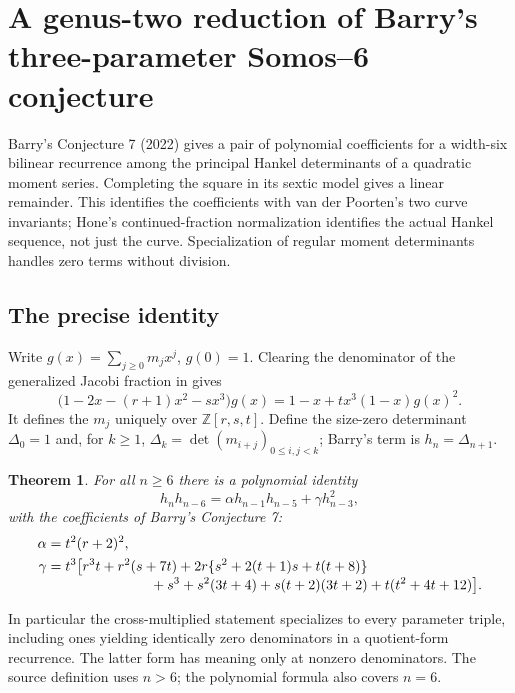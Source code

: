 \documentclass[11pt,a4paper]{article}
\numberwithin{equation}{section}
\newtheorem{theorem}{Theorem}[section]
\theoremstyle{definition}
\theoremstyle{remark}
\newenvironment{sectionabstract}{\par\smallskip\begingroup\small\noindent}{\par\endgroup\medskip}
\begin{document}
\par\endgroup

\begingroup

\section{\texorpdfstring{A genus-two reduction of Barry's three-parameter Somos--6 conjecture}{A genus-two reduction of Barry's three-parameter Somos--6 conjecture}}\label{section:r50taisho}
\par\medskip


\begin{sectionabstract}
Barry's Conjecture 7 (2022) gives a pair of polynomial coefficients for
a width-six bilinear recurrence among the principal Hankel determinants of a
quadratic moment series. Completing the square in its sextic model gives a
linear remainder. This identifies the coefficients with van der Poorten's
two curve invariants; Hone's continued-fraction normalization identifies the
actual Hankel sequence, not just the curve. Specialization of regular moment
determinants handles zero terms without division.
\end{sectionabstract}

\subsection{The precise identity}
Write $g(x)=\sum_{j\ge0}m_jx^j$, $g(0)=1$. Clearing the denominator of
the generalized Jacobi fraction in \cite[Conj.~7, p.~7]{r50taisho:B} gives
\begin{equation}
 \bigl(1-2x-(r+1)x^2-sx^3\bigr)g(x)
       =1-x+t x^3(1-x)g(x)^2. \label{r50taisho:eq:moment}
\end{equation}
It defines the $m_j$ uniquely over $\mathbb Z[r,s,t]$. Define the size-zero
determinant $\Delta_0=1$ and, for $k\ge1$,
$\Delta_k=\det(m_{i+j})_{0\le i,j<k}$; Barry's term is $h_n=\Delta_{n+1}$.
\begin{theorem}
For all $n\ge6$ there is a polynomial identity
\[
 h_n h_{n-6}=\alpha h_{n-1}h_{n-5}+\gamma h_{n-3}^2 ,
\]
with the coefficients of Barry's Conjecture 7:
\begin{align*}
 \alpha&=t^2(r+2)^2,\\
 \gamma &= t^3\bigl[
 r^3t+r^2(s+7t)+2r\{s^2+2(t+1)s+t(t+8)\}\\[-1mm]
 &\hspace{26mm}+s^3+s^2(3t+4)+s(t+2)(3t+2)+t(t^2+4t+12)
 \bigr].
\end{align*}
\end{theorem}
In particular the cross-multiplied statement specializes to every parameter
triple, including ones yielding identically zero denominators in a
quotient-form recurrence. The latter form has meaning only at nonzero
denominators. The source definition uses $n>6$; the polynomial formula also
covers $n=6$.
\end{document}
